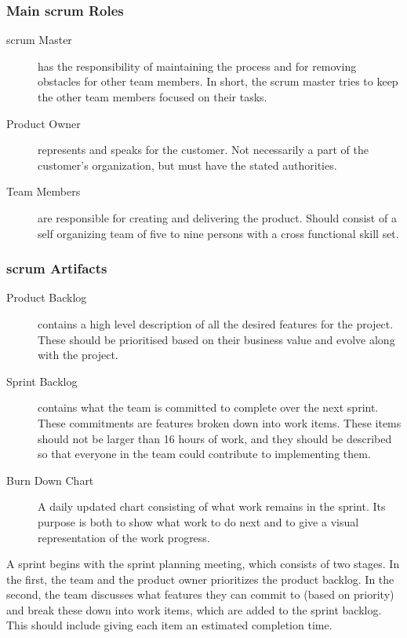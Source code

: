 \subsubsection{Main \Gls{scrum} Roles}
\begin{description}
	\item[\Gls{scrum} Master] has the responsibility of maintaining the process and
		for removing obstacles for other team members. In short, the \Gls{scrum}
		master tries to keep the other team members focused on their tasks.
	\item[Product Owner] represents and speaks for the customer. Not
		necessarily a part of the customer's organization, but must have the
		stated authorities.
	\item[Team Members] are responsible for creating and delivering the product.
		Should consist of a self organizing team of five to nine persons with
		a cross functional skill set.
\end{description}

\subsubsection{\Gls{scrum} Artifacts}
\begin{description}
	\item[Product Backlog] contains a high level description of all the desired
		features for the project. These should be prioritised based on their
		business value and evolve along with the project.
	\item[Sprint Backlog] contains what the team is committed to complete over
		the next sprint. These commitments are features broken down into work
		items. These items should not be larger than 16 hours of work, and they
		should be described so that everyone in the team could contribute to
		implementing them.
	\item[Burn Down Chart] A daily updated chart consisting of what work
		remains in the sprint. Its purpose is both to show what work to do next
		and to give a visual representation of the work progress.
\end{description}

A sprint begins with the sprint planning meeting, which consists of two
stages. In the first, the team and the product owner prioritizes the product
backlog. In the second, the team discusses what features they can commit to
(based on priority) and break these down into work items, which are added to
the sprint backlog. This should include giving each item an estimated
completion time.

